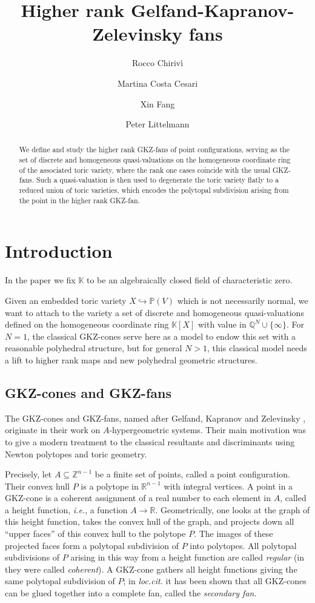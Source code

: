 \documentclass[12pt, a4article]{amsart}   	%
\title{Higher rank Gelfand-Kapranov-Zelevinsky fans}
\author{Rocco Chiriv\`i}
\author{Martina Costa Cesari}
\author{Xin Fang}
\author{Peter Littelmann}
\numberwithin{equation}{section}
\theoremstyle{plain}
\theoremstyle{definition}
\begin{document}
\maketitle
\begin{abstract}
We define and study the higher rank GKZ-fans of point configurations, serving as the set of discrete and homogeneous quasi-valuations on the homogeneous coordinate ring of the associated toric variety, where the rank one cases coincide with the usual GKZ-fans. Such a quasi-valuation is then used to degenerate the toric variety flatly to a reduced union of toric varieties, which encodes the polytopal subdivision arising from the point in the higher rank GKZ-fan.
\end{abstract}

\section{Introduction}

In the paper we fix $\mathbb{K}$ to be an algebraically closed field of characteristic zero.

Given an embedded toric variety $X\hookrightarrow \mathbb{P}(V)$ which is not necessarily normal, we want to attach to the variety a set of discrete and
homogeneous quasi-valuations defined on the homogeneous coordinate ring $\mathbb{K}[X]$ with value in $\mathbb{Q}^N\cup\{\infty\}$. 
For $N=1$, the classical GKZ-cones \cite{GKZ} serve here as a model to endow this set with a reasonable polyhedral structure, but for general $N>1$, this classical model needs a lift to higher rank maps and new polyhedral geometric structures.


\subsection{GKZ-cones and GKZ-fans}
The GKZ-cones and GKZ-fans, named after Gelfand, Kapranov and Zelevinsky \cite{GKZ}, originate in their work on $A$-hypergeometric systems. Their main motivation was to give a modern treatment to the classical resultants and discriminants using Newton polytopes and toric geometry.

Precisely, let $A\subseteq \mathbb{Z}^{n-1}$ be a finite set of points, called a point configuration. Their convex hull $P$ is a polytope in $\mathbb R^{n-1}$ with integral vertices. A point in a GKZ-cone is a coherent assignment of a real number to each element in $A$, called a height function, \emph{i.e.}, a function $A\to \mathbb{R}$. Geometrically, one looks at the graph of this height function, takes the convex hull of the graph, and projects down all ``upper faces'' of this convex hull to the polytope $P$. The images of these projected faces form a polytopal subdivision of $P$ into polytopes. All polytopal subdivisions of $P$ arising in this way from a height function are called \emph{regular} (in \cite{GKZ} they were called \emph{coherent}). A GKZ-cone gathers all height functions giving the same polytopal subdivision of $P$; in \emph{loc.cit.} it has been shown that all GKZ-cones can be glued together into a complete fan, called the \emph{secondary fan}.
\end{document}

